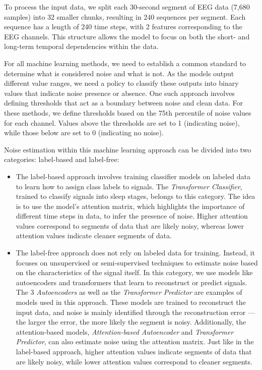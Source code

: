 To process the input data, we split each 30-second segment of EEG data (7,680 samples) into 32 smaller chunks, resulting in 240 sequences per segment. Each sequence has a length of 240 time steps, with 2 features corresponding to the EEG channels. This structure allows the model to focus on both the short- and long-term temporal dependencies within the data.

For all machine learning methods, we need to establish a common standard to determine what is considered noise and what is not. As the models output different value ranges, we need a policy to classify these outputs into binary values that indicate noise presence or absence. One such approach involves defining thresholds that act as a boundary between noise and clean data. For these methods, we define thresholds based on the 75th percentile of noise values for each channel. Values above the thresholds are set to 1 (indicating noise), while those below are set to 0 (indicating no noise).

Noise estimation within this machine learning approach can be divided into two categories: label-based and label-free:

\begin{itemize}
    \item The label-based approach involves training classifier models on labeled data to learn how to assign class labels to signals. The \emph{Transformer Classifier}, trained to classify signals into sleep stages, belongs to this category. The idea is to use the model’s attention matrix, which highlights the importance of different time steps in data, to infer the presence of noise. Higher attention values correspond to segments of data that are likely noisy, whereas lower attention values indicate cleaner segments of data.
    \vspace{-0.2cm}
    \item The label-free approach does not rely on labeled data for training. Instead, it focuses on unsupervised or semi-supervised techniques to estimate noise based on the characteristics of the signal itself. In this category, we use models like autoencoders and transformers that learn to reconstruct or predict signals. The 3 \emph{Autoencoders} as well as the \emph{Transformer Predictor} are examples of models used in this approach. These models are trained to reconstruct the input data, and noise is mainly identified through the reconstruction error — the larger the error, the more likely the segment is noisy. Additionally, the attention-based models, \emph{Attention-based Autoencoder} and \emph{Transformer Predictor}, can also estimate noise using the attention matrix. Just like in the label-based approach, higher attention values indicate segments of data that are likely noisy, while lower attention values correspond to cleaner segments.
\end{itemize}

